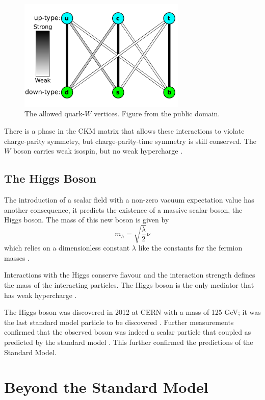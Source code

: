 \begin{figure}[htb]
    \centering
    \includegraphics[width=8cm]{Quark_weak_interactions.png}
    \caption{The allowed quark-$W$ vertices. Figure from the public domain. }
    \label{fig:CKMvisual}
\end{figure}

There is a phase in the CKM matrix that allows these interactions to violate charge-parity symmetry, but charge-parity-time symmetry is still conserved. The $W$ boson carries weak isospin, but no weak hypercharge \cite{Griffiths}.

\subsection{The Higgs Boson}

The introduction of a scalar field with a non-zero vacuum expectation value has another consequence, it predicts the existence of a massive scalar boson, the Higgs boson. The mass of this new boson is given by
\begin{equation}
    m_{h}=\sqrt{\frac{\lambda}{2}}\nu
\end{equation}
which relies on a dimensionless constant $\lambda$ like the constants for the fermion masses \cite{Peskin}.

Interactions with the Higgs conserve flavour and the interaction strength defines the mass of the interacting particles. The Higgs boson is the only mediator that has weak hypercharge \cite{Peskin}.

The Higgs boson was discovered in 2012 at CERN with a mass of 125 GeV; it was the last standard model particle to be discovered \cite{HiggsBosonCMS, HiggsBosonATLAS}. Further measurements confirmed that the observed boson was indeed a scalar particle that coupled as predicted by the standard model \cite{PDGreview}. This further confirmed the predictions of the Standard Model.

\section{Beyond the Standard Model}

